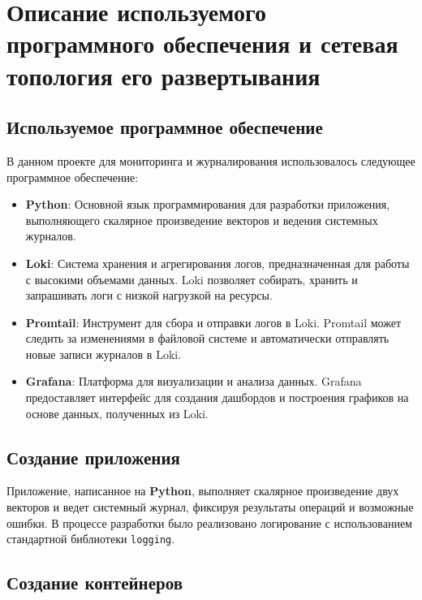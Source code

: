 \section{Описание используемого программного обеспечения
	и сетевая топология его развертывания}

\subsection{Используемое программное обеспечение}

В данном проекте для мониторинга
и журналирования использовалось следующее программное обеспечение:

\begin{itemize}
    \item \textbf{Python}: Основной язык программирования
		для разработки приложения,
		выполняющего скалярное произведение векторов
		и ведения системных журналов.
    \item \textbf{Loki}: Система хранения и агрегирования логов,
		предназначенная для работы с высокими объемами данных.
		Loki позволяет собирать,
		хранить и запрашивать логи с низкой нагрузкой на ресурсы.
    \item \textbf{Promtail}: Инструмент для сбора и отправки логов в Loki.
		Promtail может следить за изменениями в файловой системе
		и автоматически отправлять новые записи журналов в Loki.
    \item \textbf{Grafana}: Платформа для визуализации и анализа данных.
		Grafana предоставляет интерфейс для создания дашбордов
		и построения графиков на основе данных, полученных из Loki.
\end{itemize}

\subsection{Создание приложения}

Приложение, написанное на \textbf{Python},
выполняет скалярное произведение двух векторов и ведет системный журнал,
фиксируя результаты операций и возможные ошибки.
В процессе разработки было реализовано логирование
с использованием стандартной библиотеки \texttt{logging}. 

\break



\subsection{Создание контейнеров}


